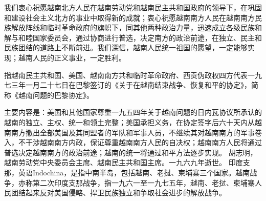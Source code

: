 我们衷心祝愿越南北方人民在越南劳动党和越南民主共和国政府的领导下，在巩固和建设社会主义北方的事业中取得新的成就；衷心祝愿越南南方人民在越南南方民族解放阵线和临时革命政府的旗帜下，同其他两种政治力量，迅速成立各级民族和解与和睦国家委员会，通过协商进行普选，决定南方的政治前途，在独立、民主和民族团结的道路上不断前进。我们深信，越南人民统一祖国的愿望，一定能够实现；越南人民的正义事业，一定胜利。

\begin{maonote}
指越南民主共和国、美国、越南南方共和临时革命政府、西贡伪政权四方代表一九七三年一月二十七日在巴黎签订的《关于在越南结束战争、恢复和平的协定》，简称《越南问题的巴黎协定》。

主要内容是：美国和其他国家尊重一九五四年关于越南问题的日内瓦协议所承认的越南的独立、主权、统一和领土完整；美国承担义务，在协定签字后六十天内从越南南方撤出全部美国及其同盟者的军队和军事人员，不继续其对越南南方的军事卷入，不干涉越南南方内政，保证尊重越南南方人民的自决权；越南南方人民将通过普选决定越南南方的政治前途；越南的统一将通过和平方法逐步实现。
胡志明，越南劳动党中央委员会主席、越南民主共和国主席。一九六九年逝世。
印度支那，英语Indochina，是指中南半岛，包括越南、老挝、柬埔寨三个国家。越南战争，亦称第二次印度支那战争，指一九六一至一九七五年，越南、老挝、柬埔寨人民团结起来反对美国侵略、捍卫民族独立和争取社会进步的解放战争。
\end{maonote}
